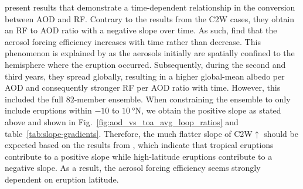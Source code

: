 \documentclass[draft]{agujournal2019}
\newcommand{\cwsn}{C2W\(\uparrow\)}
\begin{document}
 present results that demonstrate a time-dependent
relationship in the conversion between AOD and RF. Contrary to the results from the C2W
cases, they obtain an RF to AOD ratio with a negative slope over time. As such,
 find that the aerosol forcing efficiency increases with time rather
than decrease. This phenomenon is explained by  as the aerosols
initially are spatially confined to the hemisphere where the eruption occurred.
Subsequently, during the second and third years, they spread globally, resulting in a
higher global-mean albedo per AOD and consequently stronger RF per AOD ratio with time.
However, this included the full \(82\)-member ensemble. When constraining the ensemble
to only include eruptions within \(-10\) to \(\SI{10}{\degree\mathrm{N}}\), we obtain
the positive slope as stated above and shown in
Fig.~\ref{fig:aod_vs_toa_avg_loop_ratios} and table~\ref{tab:slope-gradients}.
Therefore, the much flatter slope of \cwsn{} should be expected based on the results
from , which indicate that tropical eruptions contribute to a
positive slope while high-latitude eruptions contribute to a negative slope. As a
result, the aerosol forcing efficiency seems strongly dependent on eruption latitude.
\end{document}
